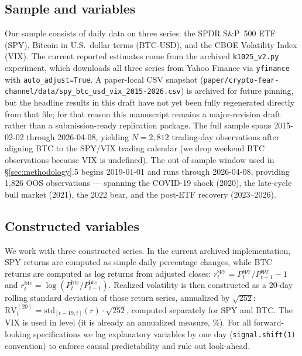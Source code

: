 \documentclass[11pt,a4paper]{article}
\begin{document}
\subsection{Sample and variables}

Our sample consists of daily data on three series: the SPDR S\&P~500 ETF (SPY), Bitcoin in U.S.\ dollar terms (BTC-USD), and the CBOE Volatility Index (VIX). The current reported estimates come from the archived \texttt{k1025\_v2.py} experiment, which downloads all three series from Yahoo Finance via \texttt{yfinance} with \texttt{auto\_adjust=True}. A paper-local CSV snapshot (\texttt{paper/crypto-fear-channel/data/spy\_btc\_usd\_vix\_2015-2026.csv}) is archived for future pinning, but the headline results in this draft have not yet been fully regenerated directly from that file; for that reason this manuscript remains a major-revision draft rather than a submission-ready replication package. The full sample spans 2015-02-02 through 2026-04-08, yielding $N = 2{,}812$ trading-day observations after aligning BTC to the SPY/VIX trading calendar (we drop weekend BTC observations because VIX is undefined). The out-of-sample window used in \S\ref{sec:methodology}.5 begins 2019-01-01 and runs through 2026-04-08, providing 1{,}826 OOS observations --- spanning the COVID-19 shock (2020), the late-cycle bull market (2021), the 2022 bear, and the post-ETF recovery (2023--2026).%

\subsection{Constructed variables}

We work with three constructed series. In the current archived implementation, SPY returns are computed as simple daily percentage changes, while BTC returns are computed as log returns from adjusted closes: $r^{\text{spy}}_t = P^{\text{spy}}_t / P^{\text{spy}}_{t-1} - 1$ and $r^{\text{btc}}_t = \log(P^{\text{btc}}_t / P^{\text{btc}}_{t-1})$. Realized volatility is then constructed as a 20-day rolling standard deviation of those return series, annualized by $\sqrt{252}$: $\text{RV}^{(20)}_t = \text{std}_{[t-19,t]}(r) \cdot \sqrt{252}$, computed separately for SPY and BTC. The VIX is used in level (it is already an annualized measure, $\%$). For all forward-looking specifications we lag explanatory variables by one day (\texttt{signal.shift(1)} convention) to enforce causal predictability and rule out look-ahead.
\end{document}
